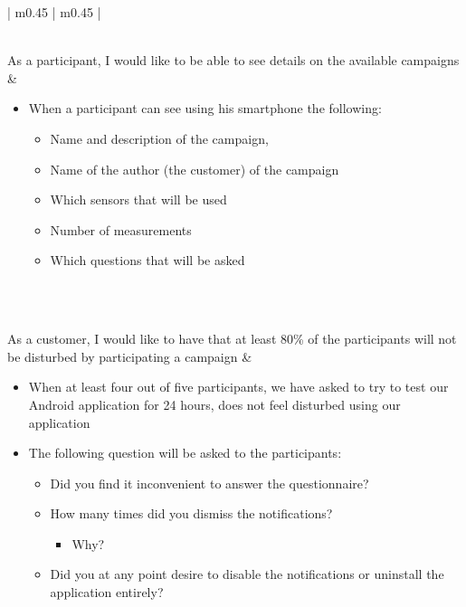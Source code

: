\begin{center}
\begin{longtable}{| m{} | m{} |}
\begin{itemize}[noitemsep,topsep=0pt,parsep=0pt,partopsep=0pt]
	\end{itemize} \\ \hline
	As a participant, I would like to be able to see details on the available campaigns &
	\begin{itemize}[noitemsep,topsep=0pt,parsep=0pt,partopsep=0pt]
		\item When a participant can see using his smartphone the following:
		\begin{itemize}[noitemsep,topsep=0pt,parsep=0pt,partopsep=0pt]
			\item Name and description of the campaign, 
			\item Name of the author (the customer) of the campaign
			\item Which sensors that will be used
			\item Number of measurements
			\item Which questions that will be asked
		\end{itemize}
	\end{itemize} \\ \hline

	 \\ \hline
	As a customer, I would like to have that at least 80\% of the participants will not be disturbed by participating a campaign &
	 \begin{itemize}
	 	\item When at least four out of five participants, we have asked to try to test our Android application for 24 hours, does not feel disturbed using our application
	 	\item The following question will be asked to the participants:
	 		\begin{itemize}
	 			\item Did you find it inconvenient to answer the questionnaire?
				\item How many times did you dismiss the notifications?
					\begin{itemize}
						\item Why?
					\end{itemize}
				\item Did you at any point desire to disable the notifications or uninstall the application entirely?
	 		\end{itemize}
	 \end{itemize}
	 \\ \hline
	 \\ \hline
	

\end{longtable}
\end{center}
